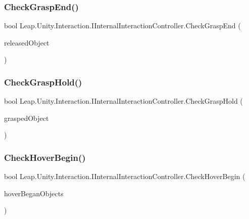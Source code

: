 \subsubsection{\texorpdfstring{CheckGraspEnd()}{CheckGraspEnd()}}
{\footnotesize\ttfamily bool Leap.\+Unity.\+Interaction.\+I\+Internal\+Interaction\+Controller.\+Check\+Grasp\+End (\begin{DoxyParamCaption}\item[{out \mbox{\hyperlink{interface_leap_1_1_unity_1_1_interaction_1_1_i_interaction_behaviour}{I\+Interaction\+Behaviour}}}]{released\+Object }\end{DoxyParamCaption})}

\mbox{\label{interface_leap_1_1_unity_1_1_interaction_1_1_i_internal_interaction_controller_a4b6e0db263b465625da40783b04811f1}} 
\subsubsection{\texorpdfstring{CheckGraspHold()}{CheckGraspHold()}}
{\footnotesize\ttfamily bool Leap.\+Unity.\+Interaction.\+I\+Internal\+Interaction\+Controller.\+Check\+Grasp\+Hold (\begin{DoxyParamCaption}\item[{out \mbox{\hyperlink{interface_leap_1_1_unity_1_1_interaction_1_1_i_interaction_behaviour}{I\+Interaction\+Behaviour}}}]{grasped\+Object }\end{DoxyParamCaption})}

\mbox{\label{interface_leap_1_1_unity_1_1_interaction_1_1_i_internal_interaction_controller_ab4e300cb612b32c697ac121a565258f9}} 
\subsubsection{\texorpdfstring{CheckHoverBegin()}{CheckHoverBegin()}}
{\footnotesize\ttfamily bool Leap.\+Unity.\+Interaction.\+I\+Internal\+Interaction\+Controller.\+Check\+Hover\+Begin (\begin{DoxyParamCaption}\item[{out Hash\+Set$<$ \mbox{\hyperlink{interface_leap_1_1_unity_1_1_interaction_1_1_i_interaction_behaviour}{I\+Interaction\+Behaviour}} $>$}]{hover\+Began\+Objects }\end{DoxyParamCaption})}

